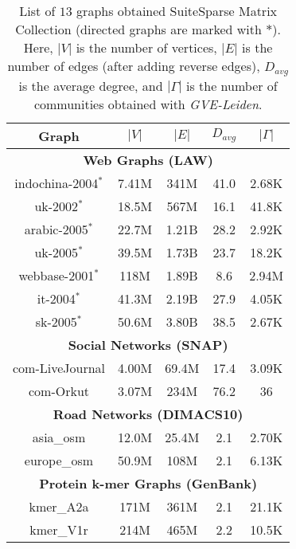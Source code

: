 \begin{table}[hbtp]
  \centering
  \caption{List of $13$ graphs obtained SuiteSparse Matrix Collection \cite{suite19} (directed graphs are marked with $*$). Here, $|V|$ is the number of vertices, $|E|$ is the number of edges (after adding reverse edges), $D_{avg}$ is the average degree, and $|\Gamma|$ is the number of communities obtained with \textit{GVE-Leiden}.}
  \label{tab:dataset}
  \begin{tabular}{|c||c|c|c|c|}
    \toprule
    \textbf{Graph} &
    \textbf{\textbf{$|V|$}} &
    \textbf{\textbf{$|E|$}} &
    \textbf{\textbf{$D_{avg}$}} &
    \textbf{\textbf{$|\Gamma|$}} \\
    \midrule
    \multicolumn{5}{|c|}{\textbf{Web Graphs (LAW)}} \\ \hline
    indochina-2004$^*$ & 7.41M & 341M & 41.0 & 2.68K \\ \hline
    uk-2002$^*$ & 18.5M & 567M & 16.1 & 41.8K \\ \hline
    arabic-2005$^*$ & 22.7M & 1.21B & 28.2 & 2.92K \\ \hline
    uk-2005$^*$ & 39.5M & 1.73B & 23.7 & 18.2K \\ \hline
    webbase-2001$^*$ & 118M & 1.89B & 8.6 & 2.94M \\ \hline
    it-2004$^*$ & 41.3M & 2.19B & 27.9 & 4.05K \\ \hline
    sk-2005$^*$ & 50.6M & 3.80B & 38.5 & 2.67K \\ \hline
    \multicolumn{5}{|c|}{\textbf{Social Networks (SNAP)}} \\ \hline
    com-LiveJournal & 4.00M & 69.4M & 17.4 & 3.09K \\ \hline
    com-Orkut & 3.07M & 234M & 76.2 & 36 \\ \hline
    \multicolumn{5}{|c|}{\textbf{Road Networks (DIMACS10)}} \\ \hline
    asia\_osm & 12.0M & 25.4M & 2.1 & 2.70K \\ \hline
    europe\_osm & 50.9M & 108M & 2.1 & 6.13K \\ \hline
    \multicolumn{5}{|c|}{\textbf{Protein k-mer Graphs (GenBank)}} \\ \hline
    kmer\_A2a & 171M & 361M & 2.1 & 21.1K \\ \hline
    kmer\_V1r & 214M & 465M & 2.2 & 10.5K \\ \hline
  \bottomrule
  \end{tabular}
\end{table}
